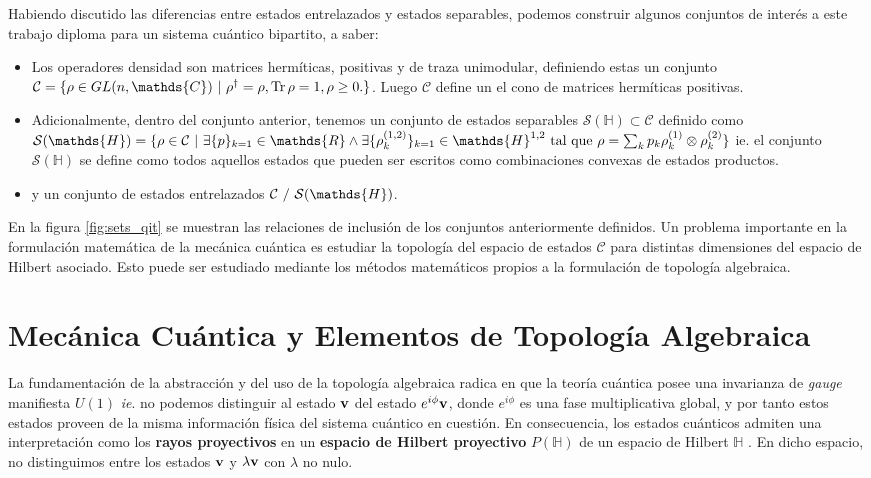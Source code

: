 \documentclass{report} %
\numberwithin{equation}{section}
\begin{document}
Habiendo discutido las diferencias entre estados entrelazados y estados separables, podemos construir algunos conjuntos de interés a este trabajo diploma para un sistema cuántico bipartito, a saber:

\begin{itemize}
    \item Los operadores densidad son matrices hermíticas, positivas y de traza unimodular, definiendo estas un conjunto $\mathcal{C} = \{\rho \in GL(n, \mathds{C}) \textnormal{ }| \textnormal{ }\rho^{\dagger} = \rho, \Tr \rho = 1, \rho \geq 0.\}$. Luego $\mathcal{C}$ define un el cono de matrices hermíticas positivas.
    
    \item Adicionalmente, dentro del conjunto anterior, tenemos un conjunto de estados separables $\mathcal{S}(\mathds{H}) \subset \mathcal{C}$ definido como $\mathcal{S}(\mathds{H})=\{ \rho \in \mathcal{C} \textnormal{ | } \exists \{p\}_{k=1} \in \mathds{R} \land \exists \{\rho_{k}^{(1, 2)}\}_{k=1} \in \mathds{H}^{1,2} \textnormal{ tal que }\rho = \sum_{k} p_{k} \rho_{k}^{(1)}\otimes\rho_{k}^{(2)}\}$ ie. el conjunto $\mathcal{S}(\mathds{H})$ se define como todos aquellos estados que pueden ser escritos como combinaciones convexas de estados productos. 
    
    \item y un conjunto de estados entrelazados $\mathcal{C} \textnormal{ / } \mathcal{S}(\mathds{H})$.
\end{itemize}

En la figura \ref{fig:sets_qit} se muestran las relaciones de inclusión de los conjuntos anteriormente definidos. Un problema importante en la formulación matemática de la mecánica cuántica es estudiar la topología del espacio de estados $\mathcal{C}$ para distintas dimensiones del espacio de Hilbert asociado. Esto puede ser estudiado mediante los métodos matemáticos propios a la formulación de topología algebraica.

\section{Mecánica Cuántica y Elementos de Topología Algebraica}

La fundamentación de la abstracción y del uso de la topología algebraica radica en que la teoría cuántica posee una invarianza de \textit{gauge} manifiesta $U(1)$ \textit{ie}. no podemos distinguir al estado ${\bf v}$ del estado $e^{i \phi}{\bf v}$, donde $e^{i \phi}$ es una fase multiplicativa global, y por tanto estos estados proveen de la misma información física del sistema cuántico en cuestión. En consecuencia, los estados cuánticos admiten una interpretación como los \textbf{rayos proyectivos} en un \textbf{espacio de Hilbert proyectivo} $P(\mathds{H})$ de un espacio de Hilbert $\mathds{H}$ \cite{Hatcher:AT, GoldbartStone}. En dicho espacio, no distinguimos entre los estados ${\bf v}$ y $\lambda {\bf v}$ con $\lambda$ no nulo.
\end{document}
